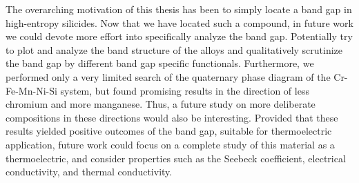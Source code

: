 \documentclass[UKenglish]{ifimaster}  %
\begin{document}
The overarching motivation of this thesis has been to simply locate a band gap in high-entropy silicides. Now that we have located such a compound, in future work we could devote more effort into specifically analyze the band gap. Potentially try to plot and analyze the band structure of the alloys and qualitatively scrutinize the band gap by different band gap specific functionals. Furthermore, we performed only a very limited search of the quaternary phase diagram of the Cr-Fe-Mn-Ni-Si system, but found promising results in the direction of less chromium and more manganese. Thus, a future study on more deliberate compositions in these directions would also be interesting. Provided that these results yielded positive outcomes of the band gap, suitable for thermoelectric application, future work could focus on a complete study of this material as a thermoelectric, and consider properties such as the Seebeck coefficient, electrical conductivity, and thermal conductivity. 

\appendix


\backmatter{}
\printbibliography
\end{document}

